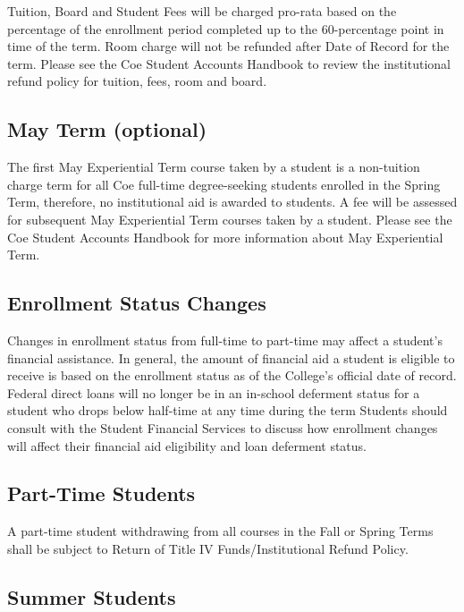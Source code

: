 \documentclass[
  letterpaper,
]{scrbook}
\begin{document}
Tuition, Board and Student Fees will be charged pro-rata based on the
percentage of the enrollment period completed up to the 60-percentage
point in time of the term. Room charge will not be refunded after Date
of Record for the term. Please see the Coe Student Accounts Handbook to
review the institutional refund policy for tuition, fees, room and
board.

\subsection{May Term (optional)}\label{may-term-optional}

The first May Experiential Term course taken by a student is a
non-tuition charge term for all Coe full-time degree-seeking students
enrolled in the Spring Term, therefore, no institutional aid is awarded
to students. A fee will be assessed for subsequent May Experiential Term
courses taken by a student. Please see the Coe Student Accounts Handbook
for more information about May Experiential Term.

\subsection{Enrollment Status Changes}\label{enrollment-status-changes}

Changes in enrollment status from full-time to part-time may affect a
student's financial assistance. In general, the amount of financial aid
a student is eligible to receive is based on the enrollment status as of
the College's official date of record. Federal direct loans will no
longer be in an in-school deferment status for a student who drops below
half-time at any time during the term Students should consult with the
Student Financial Services to discuss how enrollment changes will affect
their financial aid eligibility and loan deferment status.

\subsection{Part-Time Students}\label{part-time-students}

A part-time student withdrawing from all courses in the Fall or Spring
Terms shall be subject to Return of Title IV Funds/Institutional Refund
Policy.

\subsection{Summer Students}\label{summer-students}
\end{document}
